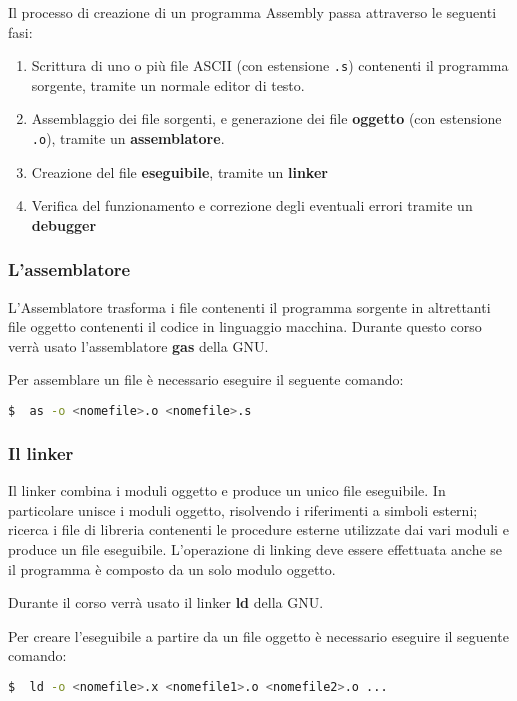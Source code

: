 \documentclass[a4paper]{article}
\theoremstyle{break}
\theoremstyle{break}
\theoremstyle{break}
\theoremstyle{break}
\begin{document}
Il processo di creazione di un programma Assembly passa attraverso le seguenti fasi:
\begin{enumerate}
	\item Scrittura di uno o più file ASCII (con estensione \texttt{.s}) contenenti il
	      programma sorgente, tramite un normale editor di testo.
	\item Assemblaggio dei file sorgenti, e generazione dei file \textbf{oggetto} (con
	      estensione \texttt{.o}), tramite un \textbf{assemblatore}.
	\item Creazione del file \textbf{eseguibile}, tramite un \textbf{linker}
	\item Verifica del funzionamento e correzione degli eventuali errori tramite un
	      \textbf{debugger}
\end{enumerate}

\subsubsection{L'assemblatore}
L'Assemblatore trasforma i file contenenti il programma sorgente in altrettanti file
oggetto contenenti il codice in linguaggio macchina. Durante questo corso verrà usato
l'assemblatore \textbf{gas} della GNU.

\noindent Per assemblare un file è necessario eseguire il seguente comando:
\begin{lstlisting}[language=bash]
  $  as -o <nomefile>.o <nomefile>.s
\end{lstlisting}

\subsubsection{Il linker}
Il linker combina i moduli oggetto e produce un unico file eseguibile. In particolare
unisce i moduli oggetto, risolvendo i riferimenti a simboli esterni; ricerca i file di
libreria contenenti le procedure esterne utilizzate dai vari moduli e produce un file
eseguibile. L'operazione di linking deve essere effettuata anche se il programma è
composto da un solo modulo oggetto.

\noindent Durante il corso verrà usato il linker \textbf{ld} della GNU.

\noindent Per creare l'eseguibile a partire da un file oggetto è necessario eseguire il
seguente comando:
\begin{lstlisting}[language=bash]
  $  ld -o <nomefile>.x <nomefile1>.o <nomefile2>.o ...
\end{lstlisting}
\end{document}
